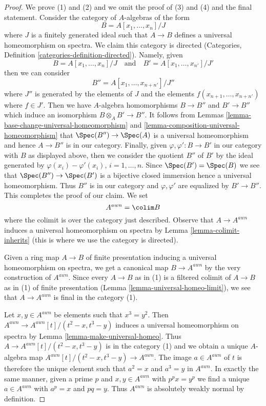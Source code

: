 \begin{proof}
We prove (1) and (2) and we omit the proof of (3) and (4) and
the final statement. Consider the category of $A$-algebras of the form
$$
B = A[x_1, \ldots, x_n]/J
$$
where $J$ is a finitely generated ideal such that $A \to B$ defines a
universal homeomorphism on spectra. We claim this category is directed
(Categories, Definition \ref{categories-definition-directed}). Namely, given
$$
B = A[x_1, \ldots, x_n]/J
\quad\text{and}\quad
B' = A[x_1, \ldots, x_{n'}]/J'
$$
then we can consider
$$
B'' = A[x_1, \ldots, x_{n + n'}]/J''
$$
where $J''$ is generated by the elements of $J$ and the elements
$f(x_{n + 1}, \ldots, x_{n + n'})$ where $f \in J'$.
Then we have $A$-algebra homomorphisms $B \to B''$ and $B' \to B''$
which induce an isomorphism $B \otimes_A B' \to B''$.
It follows from
Lemmas \ref{lemma-base-change-universal-homeomorphism} and
\ref{lemma-composition-universal-homeomorphism}
that $\Spec(B'') \to \Spec(A)$ is a universal homeomorphism and
hence $A \to B''$ is in our category.
Finally, given $\varphi, \varphi' : B \to B'$
in our category with $B$ as displayed above,
then we consider the quotient $B''$ of $B'$
by the ideal generated by $\varphi(x_i) - \varphi'(x_i)$, $i = 1, \ldots, n$.
Since $\Spec(B') = \Spec(B)$ we see that $\Spec(B'') \to \Spec(B')$
is a bijective closed immersion hence a universal homeomorphism.
Thus $B''$ is in our category and $\varphi, \varphi'$ are equalized
by $B' \to B''$. This completes the proof of our claim. We set
$$
A^{awn} = \colim B
$$
where the colimit is over the category just described. Observe that
$A \to A^{awn}$ induces a universal homeomorphism on spectra by
Lemma \ref{lemma-colimit-inherits} (this is where we use the category
is directed).

\medskip\noindent
Given a ring map $A \to B$ of finite presentation inducing a universal
homeomorphism on spectra, we get a canonical map $B \to A^{awn}$ by the
very construction of $A^{awn}$. Since every $A \to B$ as in (1)
is a filtered colimit of $A \to B$ as in (1) of finite presentation
(Lemma \ref{lemma-universal-homeo-limit}), we see that
$A \to A^{awn}$ is final in the category (1).

\medskip\noindent
Let $x, y \in A^{awn}$ be elements such that $x^3 = y^2$.
Then $A^{awn} \to A^{awn}[t]/(t^2 - x, t^3 - y)$ induces
a universal homeomorphism on spectra by Lemma \ref{lemma-make-universal-homeo}.
Thus $A \to A^{awn}[t]/(t^2 - x, t^3 - y)$ is in the category (1)
and we obtain a unique $A$-algebra map
$A^{awn}[t]/(t^2 - x, t^3 - y) \to A^{awn}$.
The image $a \in A^{awn}$ of $t$ is therefore the unique
element such that $a^2 = x$ and $a^3 = y$ in $A^{awn}$.
In exactly the same manner, given a prime $p$ and $x, y \in A^{awn}$
with $p^px = y^p$ we find a unique $a \in A^{awn}$ with
$a^p = x$ and $pq = y$. Thus $A^{awn}$ is absolutely weakly normal
by definition.


\end{proof}
